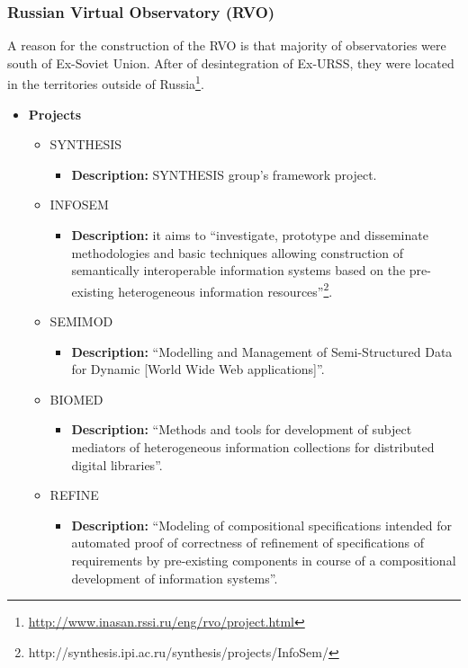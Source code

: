 \subsubsection{Russian Virtual Observatory (RVO)}
A reason for the construction of the RVO is that majority of observatories were
south of Ex-Soviet Union. After of desintegration of Ex-URSS, they were located
in the territories outside of
Russia\footnote{\url{http://www.inasan.rssi.ru/eng/rvo/project.html}}.

\begin{itemize}
\item
\textbf{Projects}
\begin{itemize}
\item SYNTHESIS
\begin{itemize}
\item \textbf{Description:} SYNTHESIS group's framework project.
\end{itemize}
\item INFOSEM
\begin{itemize}
\item \textbf{Description:} it aims to ``investigate, prototype and disseminate
methodologies and basic techniques allowing construction of semantically
interoperable information systems based on the pre-existing heterogeneous
information
resources''\footnote{http://synthesis.ipi.ac.ru/synthesis/projects/InfoSem/}.
\end{itemize}
\item SEMIMOD
\begin{itemize}
\item \textbf{Description:} ``Modelling and Management of Semi-Structured Data
for Dynamic [World Wide Web applications]''.
\end{itemize}
\item BIOMED
\begin{itemize}
\item \textbf{Description:} ``Methods and tools for development of subject
mediators of he\-te\-ro\-ge\-neous information collections for distributed
digital libraries''.
\end{itemize}
\item REFINE
\begin{itemize}
\item \textbf{Description:} ``Modeling of compositional specifications intended
for automated proof of correctness of refinement of specifications of
requirements by pre-existing components in course of a compositional development
of information systems''.
\end{itemize}

\end{itemize}
\end{itemize}
